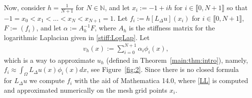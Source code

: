 \documentclass[11 pt]{article}
\newcommand\inter[1]{\llbracket #1\rrbracket}
\numberwithin{equation}{section}
\begin{document}
%
%
%
%
%

Now, consider $h=\frac{1}{N+1}$ for $N\in\mathbb N$, and let $x_i:=-1+ih$ for $i\in\inter{0,N+1}$ so that $-1=x_0<x_1<\ldots<x_{N}<x_{N+1}=1$. Let $f_i:=h [L_\Delta u](x_i)$ for $i\in\inter{0,N+1}$, $F:=(f_i)$, and let $\alpha:=A_h^{-1}F$, 
where $A_h$ is the stiffness matrix for the logarithmic Laplacian given in \eqref{stiff:LogLap}. Let 
\begin{align}\label{vdef}
v_h(x):=\sum_{i=0}^{N+1}\alpha_i \phi_i(x), 
\end{align}
which is a way to approximate $u_h$ (defined in Theorem~\ref{main:thm:intro}), namely, $f_i\approx \int_{\Omega}L_{\Delta}u(x)\phi_i(x)dx$, see Figure~\ref{fig:2}. Since there is no closed formula for $L_{\Delta}u$ we compute $f_i$ with the aid of Mathematica 14.0, where \eqref{LL} is computed and approximated numerically on the mesh grid points $x_i$.
\end{document}
